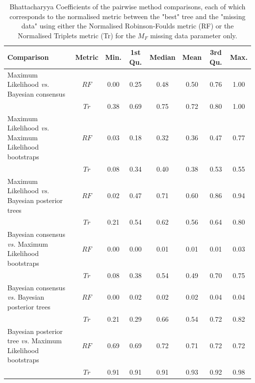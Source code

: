 \documentclass[12pt,letterpaper]{article}
\begin{document}
\begin{landscape}
\begin{table}[ht]
\caption{Bhattacharyya Coefficients of the pairwise method comparisons, each of which corresponds to the normalised metric between the "best" tree and the "missing data" using either the Normalised Robinson-Foulds metric (RF) or the Normalised Triplets metric (Tr) for the $M_{F}$ missing data parameter only.}
\label{Tab_Supp_summary_BC_MF}
\centering
\begin{tabular}{lccccccc}
  \hline
 Comparison &  Metric & Min. & 1st Qu. & Median & Mean & 3rd Qu. & Max. \\  
  \hline
    Maximum Likelihood \textit{vs.} Bayesian consensus                 & $RF$ & 0.00 & 0.25 & 0.48 & 0.50 & 0.76 & 1.00 \\ 
                                                                       & $Tr$ & 0.38 & 0.69 & 0.75 & 0.72 & 0.80 & 1.00 \\ 
    Maximum Likelihood \textit{vs.} Maximum Likelihood bootstraps      & $RF$ & 0.03 & 0.18 & 0.32 & 0.36 & 0.47 & 0.77 \\ 
                                                                       & $Tr$ & 0.08 & 0.34 & 0.40 & 0.38 & 0.53 & 0.55 \\ 
    Maximum Likelihood \textit{vs.} Bayesian posterior trees           & $RF$ & 0.02 & 0.47 & 0.71 & 0.60 & 0.86 & 0.94 \\ 
                                                                       & $Tr$ & 0.21 & 0.54 & 0.62 & 0.56 & 0.64 & 0.80 \\ 
    Bayesian consensus \textit{vs.} Maximum Likelihood bootstraps      & $RF$ & 0.00 & 0.00 & 0.01 & 0.01 & 0.01 & 0.03 \\ 
                                                                       & $Tr$ & 0.08 & 0.38 & 0.54 & 0.49 & 0.70 & 0.75 \\ 
    Bayesian consensus \textit{vs.} Bayesian posterior trees           & $RF$ & 0.00 & 0.02 & 0.02 & 0.02 & 0.04 & 0.04 \\ 
                                                                       & $Tr$ & 0.21 & 0.29 & 0.66 & 0.54 & 0.72 & 0.82 \\ 
    Bayesian posterior tree \textit{vs.} Maximum Likelihood bootstraps & $RF$ & 0.69 & 0.69 & 0.72 & 0.71 & 0.72 & 0.72 \\ 
                                                                       & $Tr$ & 0.91 & 0.91 & 0.91 & 0.93 & 0.92 & 0.98 \\ 
   \hline
\end{tabular}
\end{table}
\end{landscape}
\end{document}
